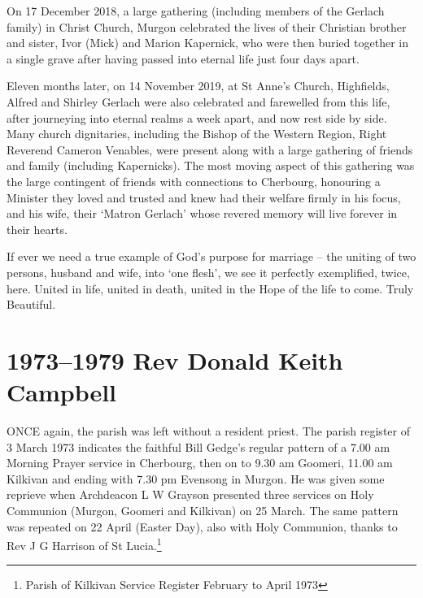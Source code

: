 On 17 December 2018, a large gathering (including members of the Gerlach family) in Christ Church, Murgon celebrated the lives of their Christian brother and sister, Ivor (Mick) and Marion Kapernick, who were then buried together in a single grave after having passed into eternal life just four days apart.



Eleven months later, on 14 November 2019, at St Anne's Church, Highfields, Alfred and Shirley Gerlach were also celebrated and farewelled from this life, after journeying into eternal realms a week apart, and now rest side by side. Many church dignitaries, including the Bishop of the Western Region, Right Reverend Cameron Venables, were present along with a large gathering of friends and family (including Kapernicks). The most moving aspect of this gathering was the large contingent of friends with connections to Cherbourg, honouring a Minister they loved and trusted and knew had their welfare firmly in his focus, and his wife, their `Matron Gerlach' whose revered memory will live forever in their hearts.



\balance


If ever we need a true example of God's purpose for marriage -- the uniting of two persons, husband and wife, into `one flesh', we see it perfectly exemplified, twice, here. United in life, united in death, united in the Hope of the life to come. Truly Beautiful.



\printendnotes[custom]
\setcounter{endnote}{0}




\chapter{1973--1979 Rev Donald Keith Campbell}
\nobalance


\lettrine[lines=3]{O}{NCE}
 again, the parish was left without a resident priest. The parish register of 3 March 1973 indicates the faithful Bill Gedge's regular pattern of a 7.00 am Morning Prayer service in Cherbourg, then on to 9.30 am Goomeri, 11.00 am Kilkivan and ending with 7.30 pm Evensong in Murgon. He was given some reprieve when Archdeacon L W Grayson presented three services on Holy Communion (Murgon, Goomeri and Kilkivan) on 25 March. The same pattern was repeated on 22 April (Easter Day), also with Holy Communion, thanks to Rev J G Harrison of St Lucia.\footnote{Parish of Kilkivan Service Register February to April 1973}







